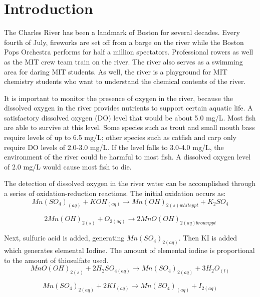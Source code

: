

\section{Introduction}  
The Charles River has been a landmark of Boston for several decades. Every fourth of July, fireworks are set off from a barge on the river while the Boston Pops Orchestra performs for half a million spectators.  Professional rowers as well as the MIT crew team train on the river. The river also serves as a swimming area for daring MIT students.  As well, the river is a playground for MIT chemistry students who want to understand the chemical contents of the river. 

It is important to monitor the presence of oxygen in the river, because the dissolved oxygen in the river provides nutrients to support certain aquatic life.  A satisfactory dissolved oxygen (DO) level that would be about 5.0 mg/L. Most fish are able to survive at this level. Some species such as trout and small mouth bass require levels of up to 6.5 mg/L; other species such as catfish and carp only require DO levels of 2.0-3.0 mg/L. If the level falls to 3.0-4.0 mg/L, the environment of the river could be harmful to most fish. A dissolved oxygen level of 2.0 mg/L would cause most fish to die. 

The detection of dissolved oxygen in the river water can be accomplished through a series of oxidation-reduction reactions. The initial oxidation occurs as:
\begin{equation}
Mn(SO_4)_{(aq)} + KOH_{(aq)} \longrightarrow Mn(OH)_{2(s)white ppt} + K_2SO_4
\end{equation}

\begin{equation}
2Mn(OH)_{2(s)} + O_{2(aq)} \longrightarrow 2MnO(OH)_{2(aq)brown ppt}
\end{equation}

Next, sulfuric acid is added, generating $Mn(SO_4)_{2(aq)}$. Then KI is added which generates elemental Iodine. The amount of elemental iodine is proportional to the amount of thiosulfate used. 
\begin{equation}
MnO(OH)_{2(s)} + 2H_2SO_{4(aq)} \longrightarrow Mn(SO_4)_{2(aq)} + 3H_2O_{(l)}
\end{equation}

\begin{equation}
Mn(SO_4)_{2(aq)} + 2KI_{(aq)} \longrightarrow Mn(SO_4)_{(aq)} + I_{2(aq)}
\end{equation}

